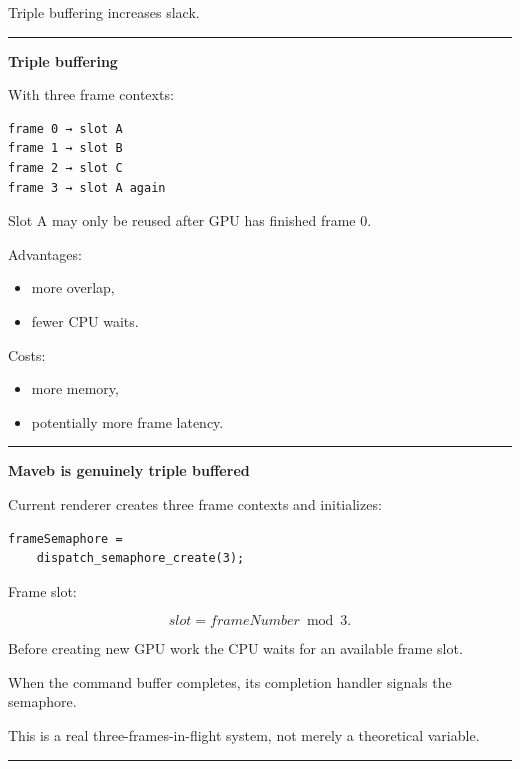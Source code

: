 Triple buffering increases slack.

\begin{center}\rule{0.5\linewidth}{0.5pt}\end{center}

\textbf{Triple buffering}

With three frame contexts:

\protect{}\label{p10-triple}%
\begin{verbatim}
frame 0 → slot A
frame 1 → slot B
frame 2 → slot C
frame 3 → slot A again
\end{verbatim}

Slot A may only be reused after GPU has finished frame 0.

Advantages:

\begin{itemize}
\tightlist
\item
  more overlap,
\item
  fewer CPU waits.
\end{itemize}

Costs:

\begin{itemize}
\tightlist
\item
  more memory,
\item
  potentially more frame latency.
\end{itemize}

\begin{center}\rule{0.5\linewidth}{0.5pt}\end{center}

\textbf{Maveb is genuinely triple buffered}

Current renderer creates three frame contexts and initializes:

\protect{}\label{p10-maveb-semaphore}%
\begin{verbatim}
frameSemaphore =
    dispatch_semaphore_create(3);
\end{verbatim}

Frame slot:

\[
\boxed{
slot=
frameNumber\bmod3.
}
\]

Before creating new GPU work the CPU waits for an available frame slot.

When the command buffer completes, its completion handler signals the semaphore.

This is a real three-frames-in-flight system, not merely a theoretical  variable.

\begin{center}\rule{0.5\linewidth}{0.5pt}\end{center}

